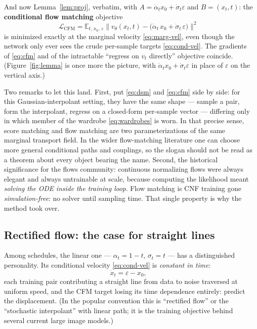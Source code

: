\documentclass[10pt,a4paper]{article}
\newcommand{\E}{\mathbb{E}}
\newcommand{\veps}{\varepsilon}
\begin{document}
And now Lemma~\ref{lem:proj}, verbatim, with
$A = \dot\alpha_t x_0 + \dot\sigma_t\veps$ and $B = (x_t, t)$: the
\textbf{conditional flow matching} objective
\begin{equation}
\boxed{\;\mathcal{L}_{\mathrm{CFM}}
= \E_{t,\,x_0,\,\veps}
\big\| v_\theta(x_t, t) - \big(\dot\alpha_t\, x_0 + \dot\sigma_t\, \veps\big) \big\|^2\;}
\label{eq:cfm}
\end{equation}
is minimized exactly at the marginal velocity \eqref{eq:marg-vel}, even
though the network only ever sees the crude per-sample targets
\eqref{eq:cond-vel}. The gradients of \eqref{eq:cfm} and of the intractable
``regress on $v_t$ directly'' objective coincide. (Figure~\ref{fig:lemma}
is once more the picture, with $\dot\alpha_t x_0 + \dot\sigma_t \veps$ in
place of $\veps$ on the vertical axis.)

Two remarks to let this land. First, put \eqref{eq:dsm} and \eqref{eq:cfm}
side by side: for this Gaussian-interpolant setting, they have the same
shape --- sample a pair, form the interpolant, regress on a closed-form
per-sample vector --- differing only in which member of the wardrobe
\eqref{eq:wardrobes} is worn. In that precise sense, score matching and
flow matching are two parameterizations of the same marginal transport
field. In the wider flow-matching literature one can choose more general
conditional paths and couplings, so the slogan should not be read as a
theorem about every object bearing the name. Second, the historical
significance for the flows community: continuous normalizing flows were
always elegant and always untrainable at scale, because computing the
likelihood meant \emph{solving the ODE inside the training loop}. Flow
matching is CNF training gone \emph{simulation-free}: no solver until
sampling time. That single property is why the method took over.

\subsection{Rectified flow: the case for straight lines}

Among schedules, the linear one --- $\alpha_t = 1 - t$, $\sigma_t = t$ ---
has a distinguished personality. Its conditional velocity
\eqref{eq:cond-vel} is \emph{constant in time}:
\begin{equation}
\dot x_t = \veps - x_0,
\end{equation}
each training pair contributing a straight line from data to noise
traversed at uniform speed, and the CFM target losing its time dependence
entirely: predict the displacement. (In the popular convention this is
``rectified flow'' or the ``stochastic interpolant'' with linear path;
it is the training objective behind several current large image models.)
\end{document}
